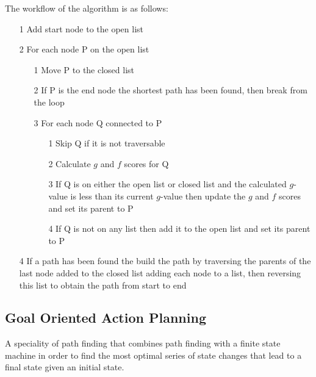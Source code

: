 \documentclass[a4paper]{article}
\begin{document}
The workflow of the algorithm is as follows:

\begin{enumerate}
  \item[1]
    Add start node to the open list

  \item[2]
    For each node P on the open list

    \begin{enumerate}
      \item[1]
        Move P to the closed list

      \item[2]
        If P is the end node the shortest path has been found, then break from the
        loop

      \item[3]
        For each node Q connected to P

      \begin{enumerate}
        \item[1]
          Skip Q if it is not traversable

        \item[2]
          Calculate $g$ and $f$ scores for Q

        \item[3]
          If Q is on either the open list or closed list and the calculated
          $g$-value is less than its current $g$-value then update the $g$ and
          $f$ scores and set its parent to P

        \item[4]
          If Q is not on any list then add it to the open list and set its
          parent to P
      \end{enumerate}
    \end{enumerate}

  \item[4]
    If a path has been found the build the path by traversing the parents of the
    last node added to the closed list adding each node to a list, then
    reversing this list to obtain the path from start to end
\end{enumerate}

\subsection{Goal Oriented Action Planning}

A speciality of path finding that combines path finding with a finite state
machine in order to find the most optimal series of state changes that lead to a
final state given an initial state.
\end{document}
